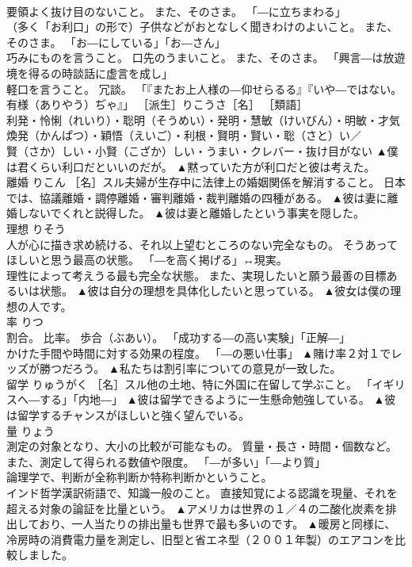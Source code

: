 \documentclass[8pt]{extreport}
\begin{document}
\begin{CJK}{UTF8}{min}
\\	要領よく抜け目のないこと。 また、そのさま。 「―に立ちまわる」 
\\	（多く「お利口」の形で）子供などがおとなしく聞きわけのよいこと。 また、そのさま。 「お―にしている」「お―さん」 
\\	巧みにものを言うこと。 口先のうまいこと。 また、そのさま。 「興言―は放遊境を得るの時談話に虚言を成し」 
\\	軽口を言うこと。 冗談。 「『またお上人様の―仰せらるる』『いや―ではない。 有様（ありやう）ぢゃ』」 ［派生］りこうさ［名］ ［類語］
\\	利発・怜悧（れいり）・聡明（そうめい）・発明・慧敏（けいびん）・明敏・才気煥発（かんぱつ）・穎悟（えいご）・利根・賢明・賢い・聡（さと）い／
\\	賢（さか）しい・小賢（こざか）しい・うまい・クレバー・抜け目がない	▲僕は君くらい利口だといいのだが。 ▲黙っていた方が利口だと彼は考えた。
\\	離婚	りこん	［名］スル夫婦が生存中に法律上の婚姻関係を解消すること。 日本では、協議離婚・調停離婚・審判離婚・裁判離婚の四種がある。	▲彼は妻に離婚しないでくれと説得した。 ▲彼は妻と離婚したという事実を隠した。
\\	理想	りそう	
\\	人が心に描き求め続ける、それ以上望むところのない完全なもの。 そうあってほしいと思う最高の状態。 「―を高く掲げる」↔現実。 
\\	理性によって考えうる最も完全な状態。 また、実現したいと願う最善の目標あるいは状態。	▲彼は自分の理想を具体化したいと思っている。 ▲彼女は僕の理想の人です。
\\	率	りつ	
\\	割合。 比率。 歩合（ぶあい）。 「成功する―の高い実験」「正解―」 
\\	かけた手間や時間に対する効果の程度。 「―の悪い仕事」	▲賭け率２対１でレッズが勝つだろう。 ▲私たちは割引率についての意見が一致した。
\\	留学	りゅうがく	［名］スル他の土地、特に外国に在留して学ぶこと。 「イギリスへ―する」「内地―」	▲彼は留学できるように一生懸命勉強している。 ▲彼は留学するチャンスがほしいと強く望んでいる。
\\	量	りょう	
\\	測定の対象となり、大小の比較が可能なもの。 質量・長さ・時間・個数など。 また、測定して得られる数値や限度。 「―が多い」「―より質」 
\\	論理学で、判断が全称判断か特称判断かということ。 
\\	インド哲学漢訳術語で、知識一般のこと。 直接知覚による認識を現量、それを超える対象の論証を比量という。	▲アメリカは世界の１／４の二酸化炭素を排出しており、一人当たりの排出量も世界で最も多いのです。 ▲暖房と同様に、冷房時の消費電力量を測定し、旧型と省エネ型（２００１年製）のエアコンを比較しました。

\end{CJK}
\end{document}
